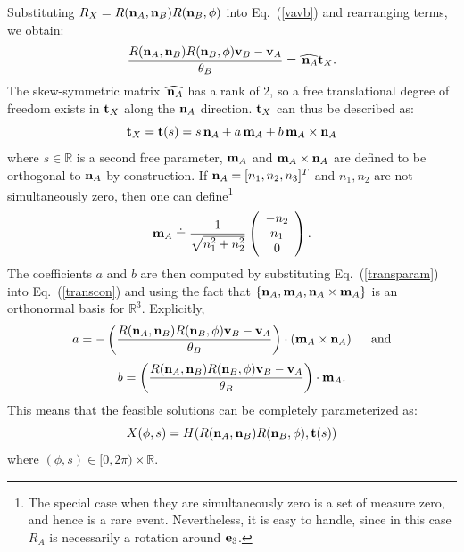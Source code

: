 \documentclass[twocolumn,10pt]{asme2ej}
\newcommand{\IR}{\mathbb{R}}
\begin{document}
Substituting $R_X = R({\bf n}_A, {\bf n}_B) R({\bf n}_B, \phi)$ into Eq.~(\ref{vavb}) and rearranging terms, we obtain:
\begin{equation}
\frac{R({\bf n}_A, {\bf n}_B) R({\bf n}_B, \phi) {\bf v}_B - {\bf v}_A}{\theta_B} = \widehat{\, {\bf n}_A} {\bf t}_X.
\label{transcon} \end{equation}
The skew-symmetric matrix $\widehat{\, {\bf n}_A}$ has a rank of 2, so a free translational degree of freedom exists in ${\bf t}_X$ along the ${\bf n}_A$ direction. ${\bf t}_X$ can thus be described as:
\begin{equation}
{\bf t}_X =  {\bf t}(s) = s \, {\bf n}_A + a \, {\bf m}_A + b \, {\bf m}_A \times {\bf n}_A
\label{transparam} \end{equation}
where $s \in \mathbb{R}$ is a second free parameter, ${\bf m}_A$ and ${\bf m}_A \times {\bf n}_A$ are
defined to be orthogonal to ${\bf n}_A$ by construction. If
${\bf n}_A  = [n_1, n_2, n_3]^T$ and $n_1, n_2$ are not simultaneously zero, then one can define\footnote{The special case when they are simultaneously zero
is a set of measure zero, and hence is a rare event. Nevertheless, it is easy to handle, since in this case $R_A$ is necessarily a rotation around ${\bf e}_3$.}
$$ {\bf m}_A \doteq \frac{1}{\sqrt{n_1^2 + n_2^2}} \left(\begin{array}{c}
-n_2 \\
n_1 \\
0 \end{array}\right).
$$
The coefficients $a$ and $b$ are then computed by substituting Eq.~(\ref{transparam}) into Eq.~(\ref{transcon}) and using the fact that
$\{{\bf n}_A, {\bf m}_A, {\bf n}_A \times {\bf m}_A\}$ is an orthonormal basis for $\mathbb{R}^3$. Explicitly,
$$ a = - \left(\frac{R({\bf n}_A, {\bf n}_B) R({\bf n}_B, \phi) {\bf v}_B - {\bf v}_A}{\theta_B}\right) \cdot \left({\bf m}_A \times {\bf n}_A\right) \hspace{5mm}\mbox{and}$$
$$ b =\left(\frac{R({\bf n}_A, {\bf n}_B) R({\bf n}_B, \phi) {\bf v}_B - {\bf v}_A}{\theta_B}\right)\cdot {\bf m}_A . $$
This means that the feasible solutions can be completely parameterized as:
\begin{equation}
X(\phi,s) = H(R({\bf n}_A, {\bf n}_B) R({\bf n}_B, \phi), {\bf t}(s))
\label{cylinder} \end{equation}
where $(\phi, s) \in [0,2\pi) \times \IR$.
\end{document}
